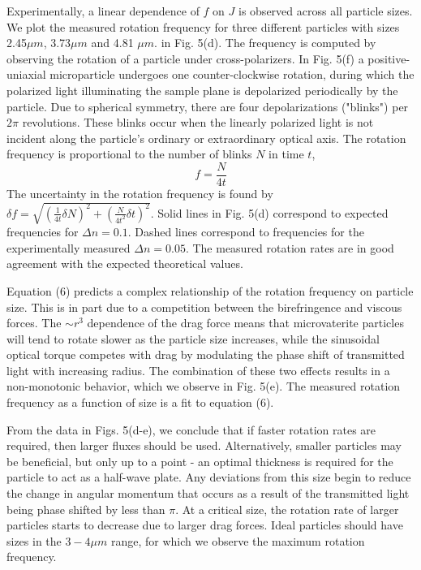 {Experimentally, a linear dependence of $f$ on
$J$ is observed across all particle sizes. We plot the measured rotation frequency for three different particles with sizes 2.45$\mu m$, 3.73$\mu m$ and
4.81 $\mu m.$ in Fig. 5(d).  The frequency is computed by observing
the rotation of a particle under cross-polarizers. In Fig. 5(f) a positive-uniaxial microparticle undergoes one counter-clockwise rotation, during which the polarized light illuminating the sample plane is depolarized periodically by the particle. Due to spherical symmetry, there are four depolarizations ("blinks")
per $2\pi$ revolutions. These blinks occur when the linearly polarized light is not incident
along the particle's ordinary or extraordinary optical
axis. The rotation frequency is proportional to the number of blinks
$N$ in time $t$,
\begin{equation}
f=\frac{N}{4t}
\end{equation}
The uncertainty in the rotation frequency is found by $\delta f=\sqrt{(\frac{1}{4t}\delta N)^{2}+(\frac{N}{4t^{2}}\delta t)^{2}}$.
Solid lines in Fig. 5(d) correspond to expected frequencies for $\Delta n=0.1$. Dashed lines correspond to frequencies for the experimentally measured $\Delta n=0.05$. The measured rotation rates are in good agreement with the expected theoretical values. 

Equation (6) predicts a complex relationship of the rotation frequency on particle size. This is in part due to a competition between the birefringence and viscous forces. The $\sim r^{3}$ dependence of the drag force means that microvaterite particles will tend to rotate slower as the particle size increases, while the sinusoidal optical torque competes with drag by modulating the phase shift of transmitted light with increasing radius. The combination of these two effects results in a non-monotonic behavior, which we observe in Fig. 5(e). The measured rotation frequency as a function of size is a fit to equation (6).

From the data in Figs. 5(d-e),  we conclude that if faster rotation
rates are required, then larger fluxes should be used. Alternatively, smaller particles may be beneficial, but only up to a point - an optimal thickness is required for the particle to act as a half-wave plate. Any deviations from this size begin to reduce the change in angular momentum that occurs as a result of the transmitted light being phase shifted by less than $\pi$. At a critical size, the rotation rate of larger particles starts to decrease due to larger drag forces. Ideal particles should have sizes in the $3-4\mu m$ range, for which we observe the maximum rotation frequency.

}
